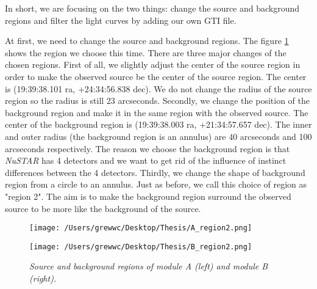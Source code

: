 \documentclass[12pt]{report}
\newcommand{\mycaption}[1]{\caption{\textit{\footnotesize #1}}}
\begin{document}
        \indent 
        In short, we are focusing on the two things: change the source and background regions and filter the 
        light curves by adding our own GTI file. 

        \indent
        At first, we need to change the source and background regions. The figure \ref{fig:region2} shows the 
        region we choose this time. There are three major changes of the chosen regions. First of all, we slightly 
        adjust the center of the source region in order to make the observed source be the center of the source 
        region. The center is (19:39:38.101 ra, +24:34:56.838 dec). 
        We do not change the radius of the source region so the radius is still 23 arcseconds. Secondly, we change 
        the position of the background region and make it in the same region with the observed source. The center of the 
        background region is (19:39:38.003 ra, +21:34:57.657 dec). The inner and outer radius (the background region
        is an annulus) are 40 arcseconds and 100 arcseconds respectively. 
        The reason we choose the background region is that  
        \textit{NuSTAR} has 4 detectors and we want to get rid of the influence of instinct differences between the 
        4 detectors. Thirdly, we change the shape of background region from a circle to an annulus. Just as before, 
        we call this choice of region as "region 2". The aim is to 
        make the background region surround the observed source to be more like the background of the source.\\ 

        \begin{figure}[!ht]
          \begin{minipage}{0.45\textwidth}
            \begin{flushleft} 
              \texttt{[image: /Users/grewwc/Desktop/Thesis/A\_region2.png]}
            \end{flushleft}
            \end{minipage}
          \begin{minipage}{0.45\textwidth}
            \begin{flushleft}
              \texttt{[image: /Users/grewwc/Desktop/Thesis/B\_region2.png]}
            \end{flushleft}
          \end{minipage}
          \centering
          \begin{minipage}{0.8\textwidth}
          \mycaption{Source and background regions of module A (left) and module B (right).}
          \label{fig:region2}
          \end{minipage}
        \end{figure}
        
\end{document}
